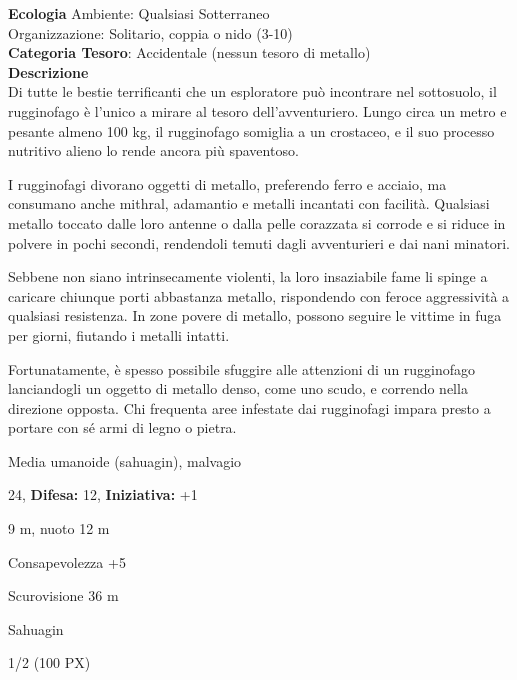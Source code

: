 \begin{multicols}{2}
{\textbf{Ecologia}
Ambiente: Qualsiasi Sotterraneo\\
Organizzazione: Solitario, coppia o nido (3-10)\\
\textbf{Categoria Tesoro}: Accidentale (nessun tesoro di metallo)\\
\textbf{Descrizione}\\
Di tutte le bestie terrificanti che un esploratore può incontrare nel sottosuolo, il rugginofago è l'unico a mirare al tesoro dell'avventuriero. Lungo circa un metro e pesante almeno 100 kg, il rugginofago somiglia a un crostaceo, e il suo processo nutritivo alieno lo rende ancora più spaventoso.

I rugginofagi divorano oggetti di metallo, preferendo ferro e acciaio, ma consumano anche mithral, adamantio e metalli incantati con facilità. Qualsiasi metallo toccato dalle loro antenne o dalla pelle corazzata si corrode e si riduce in polvere in pochi secondi, rendendoli temuti dagli avventurieri e dai nani minatori.

Sebbene non siano intrinsecamente violenti, la loro insaziabile fame li spinge a caricare chiunque porti abbastanza metallo, rispondendo con feroce aggressività a qualsiasi resistenza. In zone povere di metallo, possono seguire le vittime in fuga per giorni, fiutando i metalli intatti.

Fortunatamente, è spesso possibile sfuggire alle attenzioni di un rugginofago lanciandogli un oggetto di metallo denso, come uno scudo, e correndo nella direzione opposta. Chi frequenta aree infestate dai rugginofagi impara presto a portare con sé armi di legno o pietra.


\noindent
\begin{description}[noitemsep, topsep=0pt, parsep=0pt, partopsep=0pt, leftmargin=0cm, labelwidth=2.2cm]
	\item[\textbf{Taglia/Tipo:}] Media umanoide (sahuagin), malvagio
	\item[\textbf{Caratt.:}] 
	\item[\textbf{Punti Ferita:}] 24,  \textbf{Difesa:} 12,  \textbf{Iniziativa:} +1
	\item[\textbf{Movimento:}] 9 m, nuoto 12 m
	\item[\textbf{Tiri Salvez.:}] 
	\item[\textbf{Comp.:}] Consapevolezza +5
	\item[\textbf{Sensi:}] Scurovisione 36 m
	\item[\textbf{Linguaggi:}] Sahuagin
	\item[\textbf{Sfida:}] 1/2 (100 PX)\smallskip
\end{description}

}
\end{multicols}
